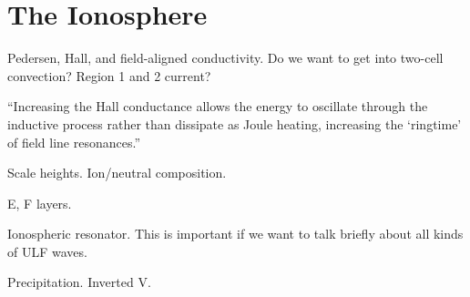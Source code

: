 



\section{The Ionosphere}

Pedersen, Hall, and field-aligned conductivity. Do we want to get into two-cell convection? Region 1 and 2 current? 


``Increasing the Hall conductance allows the energy to oscillate through the inductive process rather than dissipate as Joule heating, increasing the `ringtime' of field line resonances.''\cite{waters_2013}

Scale heights. Ion/neutral composition. 

E, F layers. 

Ionospheric \Alfven resonator. This is important if we want to talk briefly about all kinds of ULF waves. 

Precipitation. Inverted V. 



